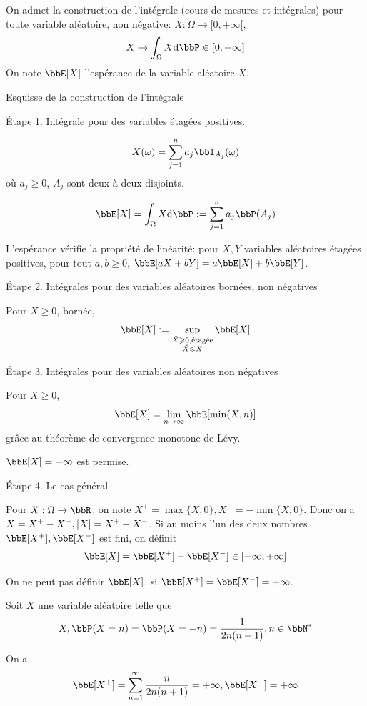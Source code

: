 On admet la construction de l'intégrale (cours de mesures et intégrales)
pour toute variable aléatoire, non négative: $X: \Omega \to [0, +\infty[$,
\[ X \tp \int_\Omega X \dif \bbP \in [0, +\infty] \]
On note $\bbE[X]$ l'espérance de la variable aléatoire $X$.

Esquisse de la construction de l'intégrale

Étape 1. Intégrale pour des variables étagées positives.

\[ X(\omega) = \sum_{j = 1}^n a_j \bbI_{A_j}(\omega) \]
où $a_j \geqslant 0$, $A_j$ sont deux à deux disjoints.

\[ \bbE[X] = \int_\Omega X \dif \bbP := \sum_{j = 1}^n a_j \bbP(A_j) \]

L'espérance vérifie la propriété de linéarité: pour $X, Y$ variables aléatoires étagées positives,
pour tout $a, b \geqslant 0$, $\bbE[aX + bY] = a \bbE[X] + b \bbE[Y]$.

Étape 2. Intégrales pour des variables aléatoires bornées, non négatives

Pour $X \geqslant 0$, bornée,
\[ \bbE[X] := \sup_{\substack{\tilde{X} \geqslant 0, \text{étagée} \\ \tilde{X} \leqslant X}} \bbE[\tilde{X}] \]

Étape 3. Intégrales pour des variables aléatoires non négatives

Pour $X \geqslant 0$,
\[ \bbE[X] = \lim_{n \to \infty} \bbE[\min(X, n)] \]
grâce au théorème de convergence monotone de Lévy.

\begin{rqq}
    $\bbE[X] = +\infty$ est permise.
\end{rqq}

Étape 4. Le cas général

Pour $X: \Omega \to \bbR$,
on note $X^+ = \max \{ X, 0 \}, X^- = -\min \{ X, 0 \}$.
Donc on a $X = X^+ - X^-, \left\lvert X \right\rvert = X^+ + X^-$.
Si au moins l'un des deux nombres $\bbE[X^+], \bbE[X^-]$ est fini, on définit
\[ \bbE[X] = \bbE[X^+] - \bbE[X^-] \in [-\infty, +\infty] \]

\begin{rqq}
    On ne peut pas définir $\bbE[X]$, si $\bbE[X^+] = \bbE[X^-] = +\infty$.
\end{rqq}

\begin{exem}
    Soit $X$ une variable aléatoire telle que
    \[ X, \bbP(X = n) = \bbP(X = -n) = \frac{1}{2n(n + 1)}, n \in \bbN^* \]

    On a
    \[ \bbE[X^+] = \sum_{n = 1}^\infty \frac{n}{2n(n + 1)} = +\infty, \bbE[X^-] = +\infty \]
\end{exem}

